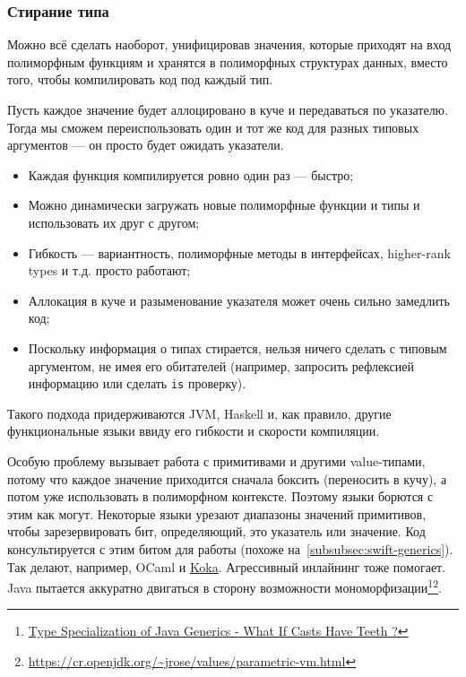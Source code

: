 \subsubsection{Стирание типа} \label{subsubsec:type-erasure}

Можно всё сделать наоборот, унифицировав значения, которые приходят на вход полиморфным функциям и хранятся в полиморфных структурах данных, вместо того, чтобы компилировать код под каждый тип.

Пусть каждое значение будет аллоцировано в куче и передаваться по указателю.
Тогда мы сможем переиспользовать один и тот же код для разных типовых аргументов --- он просто будет ожидать указатели.

\begin{itemize}
    \item[\positive] Каждая функция компилируется ровно один раз --- быстро;
    \item[\positive] Можно динамически загружать новые полиморфные функции и типы и использовать их друг с другом;
    \item[\positive] Гибкость --- вариантность, полиморфные методы в интерфейсах, higher-rank types и т.д. просто работают;
    \item[\negative] Аллокация в куче и разыменование указателя может очень сильно замедлить код;
    \item[\negative] Поскольку информация о типах стирается, нельзя ничего сделать с типовым аргументом, не имея его обитателей (например, запросить рефлексией информацию или сделать \texttt{is} проверку).
\end{itemize}

Такого подхода придерживаются JVM, Haskell и, как правило, другие функциональные языки ввиду его гибкости и скорости компиляции.

Особую проблему вызывает работа с примитивами и другими value-типами, потому что каждое значение приходится сначала боксить (переносить в кучу), а потом уже использовать в полиморфном контексте.
Поэтому языки борются с этим как могут.
Некоторые языки урезают диапазоны значений примитивов, чтобы зарезервировать бит, определяющий, это указатель или значение.
Код консультируется с этим битом для работы (похоже на~\ref{subsubsec:swift-generics}).
Так делают, например, OCaml и \href{https://koka-lang.github.io/koka/doc/book.html#sec-value-types}{Koka}.
Агрессивный инлайнинг тоже помогает.
Java пытается аккуратно двигаться в сторону возможности мономорфизации\footnote{\href{https://youtu.be/JI09cs2yUgY?si=MLkRs31mN1koXIu1}{Type Specialization of Java Generics - What If Casts Have Teeth ?}}\footnote{\url{https://cr.openjdk.org/~jrose/values/parametric-vm.html}}.

